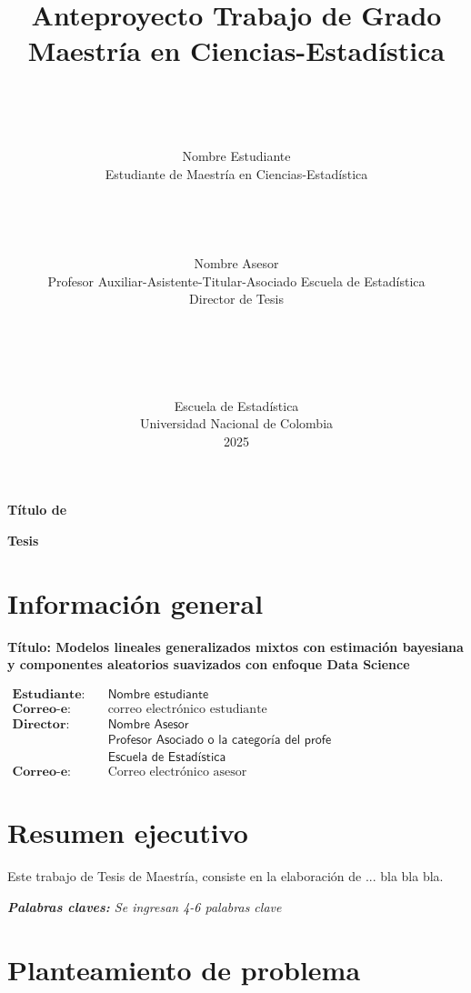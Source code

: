 \documentclass[12pt]{article}
\title{\textbf{Anteproyecto Trabajo de Grado\\
		Maestría en Ciencias-Estadística}
		\author{\\\\\\Nombre Estudiante\\ \vspace{1.0cm}
			Estudiante de Maestría en Ciencias-Estadística\\\\\\\\\\
			Nombre Asesor\\
			Profesor Auxiliar-Asistente-Titular-Asociado Escuela de Estadística\\
			Director de Tesis\\\\\\\\\\\\
			Escuela de Estadística\\
			Universidad Nacional de Colombia\\
			2025}
	}\date{}
\begin{document}
\maketitle
\newpage
\vspace{-0.5in}
\centerline{\bf{\large  Título de} }
\centerline{\bf{\large  Tesis}} %


\setlength{\parindent}{0pt}
\setlength{\parskip}{1ex plus 0.5ex minus 0.2ex} %


\tableofcontents

\section{Información general}
\textbf{Título: Modelos lineales generalizados mixtos con estimación bayesiana y componentes aleatorios suavizados con enfoque Data Science} 
\newline

$\begin{array}{llll}
\textbf{Estudiante:} & \quad \textsf{Nombre estudiante}\\
\textbf{Correo-e:} & \quad \textrm{correo electrónico estudiante}\\
\textbf{Director:} & \quad \textsf{Nombre Asesor}\\
& \quad \textsf{Profesor Asociado o la categoría del profe}\\
& \quad \textsf{Escuela de Estadística}\\
\textbf{Correo-e:} & \quad \textrm{Correo electrónico asesor}
\end{array}$

\section{Resumen ejecutivo}
Este trabajo de Tesis de Maestría, consiste en la elaboración de ... bla bla bla.

{\slshape \textbf{Palabras claves:} Se ingresan 4-6 palabras clave} 

\section{Planteamiento de problema}
\end{document}
